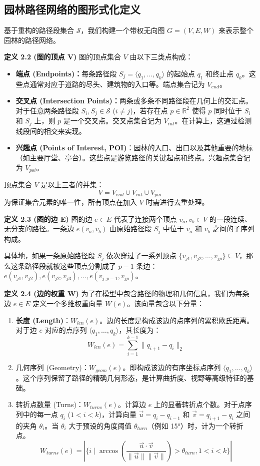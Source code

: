 \documentclass[11pt]{article}
\theoremstyle{definition}
\begin{document}
\subsection*{园林路径网络的图形式化定义}

基于重构的路径段集合 $\mathcal{S}$，我们构建一个带权无向图 $G=(V, E, W)$ 来表示整个园林的路径网络。

\textbf{定义 2.2 (图的顶点 V)} 图的顶点集合 $V$ 由以下三类点构成：

\begin{itemize}
	\item \textbf{端点 (Endpoints)：}每条路径段 $S_j = \langle q_1, \dots, q_k \rangle$ 的起始点 $q_1$ 和终止点 $q_k$。这些点通常对应于道路的尽头、建筑物的入口等。端点集合记为 $V_{end}$。
	\item \textbf{交叉点 (Intersection Points)：}两条或多条不同路径段在几何上的交汇点。对于任意两条路径段 $S_i, S_j \in \mathcal{S}$ ($i \ne j$)，若存在点 $p \in \mathbb{R}^2$ 使得 $p$ 同时位于 $S_i$ 和 $S_j$ 上，则 $p$ 是一个交叉点。交叉点集合记为 $V_{int}$。在计算上，这通过检测线段间的相交来实现。
	\item \textbf{兴趣点 (Points of Interest, POI)}：园林的入口、出口以及其他重要的地标（如主要厅堂、亭台）。这些点是游览路径的关键起点和终点。兴趣点集合记为 $V_{poi}$。
\end{itemize}

顶点集合 $V$ 是以上三者的并集：
$$ V = V_{end} \cup V_{int} \cup V_{poi} $$
为保证集合元素的唯一性，所有顶点在加入 $V$ 时需进行去重处理。

\textbf{定义 2.3 (图的边 E)} 图的边 $e \in E$ 代表了连接两个顶点 $v_a, v_b \in V$ 的一段连续、无分支的路径。一条边 $e(v_a, v_b)$ 由原始路径段 $S_j$ 中位于 $v_a$ 和 $v_b$ 之间的子序列构成。

具体地，如果一条原始路径段 $S_j$ 依次穿过了一系列顶点 $\{v_{j1}, v_{j2}, \dots, v_{jp}\} \subseteq V$，那么这条路径段就被这些顶点分割成了 $p-1$ 条边：$e(v_{j1}, v_{j2}), e(v_{j2}, v_{j3}), \dots, e(v_{j,p-1}, v_{jp})$。

\textbf{定义 2.4 (边的权重 W)}
为了在模型中包含路径的物理和几何信息，我们为每条边 $e \in E$ 定义一个多维权重向量 $W(e)$。该向量包含以下分量：

\begin{enumerate}
	\item \textbf{长度 (Length)}：$W_{len}(e)$。边的长度是构成该边的点序列的累积欧氏距离。对于边 $e$ 对应的点序列 $\langle q_1, \dots, q_k \rangle$，其长度为：
	$$ W_{len}(e) = \sum_{i=1}^{k-1} \|q_{i+1} - q_i\|_2 $$
	\item 几何序列 (Geometry)：$W_{geom}(e)$。即构成该边的有序坐标点序列 $\langle q_1, \dots, q_k \rangle$。这个序列保留了路径的精确几何形态，是计算曲折度、视野等高级特征的基础。
	\item  转折点数量 (Turns)：$W_{turns}(e)$。计算边 $e$ 上的显著转折点个数。对于点序列中的每一点 $q_i$ ($1 < i < k$)，计算向量 $\vec{u} = q_i - q_{i-1}$ 和 $\vec{v} = q_{i+1} - q_i$ 之间的夹角 $\theta_i$。当 $\theta_i$ 大于预设的角度阈值 $\theta_{turn}$（例如 15°）时，计为一个转折点。
	$$ W_{turns}(e) = \left| \{ i \mid \arccos\left(\frac{\vec{u} \cdot \vec{v}}{\|\vec{u}\| \|\vec{v}\|}\right) > \theta_{turn}, 1 < i < k \} \right| $$
\end{enumerate}
\end{document}
